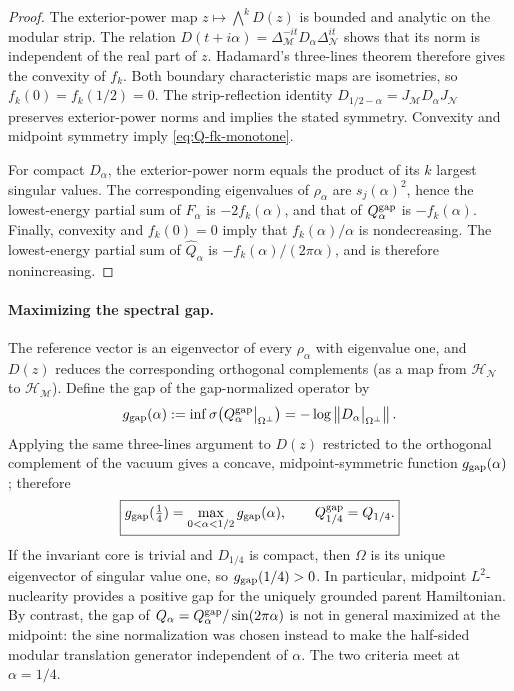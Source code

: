 \documentclass[a4paper,11pt]{article}
\theoremstyle{definition}
\newcommand{\mN}{\mathcal{N}}
\newcommand{\mH}{\mathcal{H}}
\newcommand{\mM}{\mathcal{M}}
\begin{document}
\begin{proof}
The exterior-power map $z\mapsto\bigwedge^k D(z)$ is bounded
and analytic on the modular strip. The relation
$D(t+i\alpha)=\Delta_\mM^{-it}D_\alpha\Delta_\mN^{it}$
shows that its norm is independent of the real part of $z$.
Hadamard's three-lines theorem \cite{BerghLofstrom1976}
therefore gives the convexity of $f_k$.
Both boundary characteristic maps are isometries, so $f_k(0)=
f_k(1/2)=0$. The strip-reflection identity
$D_{1/2-\alpha}=J_\mM D_\alpha J_\mN$
preserves exterior-power norms and implies the stated symmetry.
Convexity and midpoint symmetry imply \eqref{eq:Q-fk-monotone}.

For compact $D_\alpha$, the exterior-power norm equals the
product of its $k$ largest singular values. The corresponding
eigenvalues of $\rho_\alpha$ are $s_j(\alpha)^2$, hence the
lowest-energy partial sum of $F_\alpha$ is $-2f_k(\alpha)$,
and that of $Q_\alpha^{\rm gap}$ is $-f_k(\alpha)$.
Finally, convexity and $f_k(0)=0$ imply that
$f_k(\alpha)/\alpha$ is nondecreasing. The lowest-energy
partial sum of $\widehat Q_\alpha$ is
$-f_k(\alpha)/(2\pi\alpha)$, and is therefore nonincreasing.
\end{proof}

\paragraph{Maximizing the spectral gap.}
The reference vector is an eigenvector of every $\rho_\alpha$
with eigenvalue one, and $D(z)$ reduces the corresponding
orthogonal complements (as a map from $\mH_\mN$ to $\mH_\mM$).
Define the gap of the gap-normalized operator by
\begin{equation}
 g_{\rm gap}(\alpha)
 :=\inf\sigma\!\left(
 Q_\alpha^{\rm gap}\big|_{\Omega^\perp}\right)
 =-\log\left\|
 D_\alpha\big|_{\Omega^\perp}\right\|.
 \label{eq:Q-midpoint-gap}
\end{equation}
Applying the same three-lines argument to $D(z)$ restricted
to the orthogonal complement of the vacuum gives a concave,
midpoint-symmetric function $g_{\rm gap}(\alpha)$; therefore
\begin{equation}
 \boxed{
 g_{\rm gap}(\tfrac14)
 =\max_{0<\alpha<1/2}g_{\rm gap}(\alpha),
 \qquad Q_{1/4}^{\rm gap}=Q_{1/4}.}
 \label{eq:Q-gap-optimal-midpoint}
\end{equation}
If the invariant core is trivial and $D_{1/4}$ is compact,
then $\Omega$ is its unique eigenvector of singular value one,
so $g_{\rm gap}(1/4)>0$. In particular, midpoint
$L^2$-nuclearity provides a positive gap for the uniquely grounded
parent Hamiltonian. By contrast, the gap of
$Q_\alpha=Q_\alpha^{\rm gap}/\sin(2\pi\alpha)$ is not
in general maximized at the midpoint: the sine normalization was
chosen instead to make the half-sided modular translation generator
independent of $\alpha$. The two criteria meet at $\alpha=1/4$.
\end{document}
